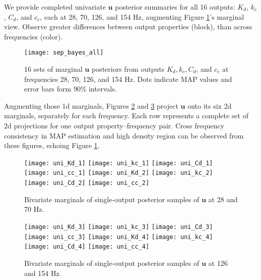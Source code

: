 \documentclass[12pt]{article}
\begin{document}
{We provide completed univariate $\mathbf{u}$ posterior
summaries for all 16 outputs: $K_d$, $k_c$, $C_d$,
and $c_c$, each at 28, 70, 126, and 154 Hz, augmenting Figure
\ref{fig:unibayes_5}'s marginal view. Observe greater
differences between output properties (block), than across frequencies (color).
\begin{figure}[ht!]
\centering
\texttt{[image: sep\_bayes\_all]}
\caption{16 sets of marginal  $\mathbf{u}$  posteriors 
from outputs $K_d, k_c, C_d$, and $c_c$  at frequencies 28, 70, 126, and 154 Hz.
Dots indicate MAP values and error bars form 90\% intervals.}
\label{fig:unibayes_5}
\end{figure}
Augmenting those 1d marginals, Figures \ref{fig:uni_1} and \ref{fig:uni_3}
project $\mathbf{u}$  onto its six 2d marginals, separately for each
frequency. Each row represents a complete set of 2d projections for one output
property--frequency pair. Cross frequency consistency in MAP estimation and
high density region can be observed from these figures, echoing Figure
\ref{fig:unibayes_5}.
\begin{figure}[ht!]
\centering
\texttt{[image: uni\_Kd\_1]}
\texttt{[image: uni\_kc\_1]}
\texttt{[image: uni\_Cd\_1]}
\texttt{[image: uni\_cc\_1]}
\texttt{[image: uni\_Kd\_2]}
\texttt{[image: uni\_kc\_2]}
\texttt{[image: uni\_Cd\_2]}
\texttt{[image: uni\_cc\_2]}
\caption{Bivariate marginals of single-output posterior samples of $\mathbf{u}$ 
at 28 and 70 Hz.}
\label{fig:uni_1}
\end{figure}
\begin{figure}[ht!]
\centering
\texttt{[image: uni\_Kd\_3]}
\texttt{[image: uni\_kc\_3]}
\texttt{[image: uni\_Cd\_3]}
\texttt{[image: uni\_cc\_3]}
\texttt{[image: uni\_Kd\_4]}
\texttt{[image: uni\_kc\_4]}
\texttt{[image: uni\_Cd\_4]}
\texttt{[image: uni\_cc\_4]}
\caption{Bivariate marginals of single-output posterior samples of $\mathbf{u}$ 
at 126 and 154 Hz.}
\label{fig:uni_3}
\end{figure}


}
\end{document}
